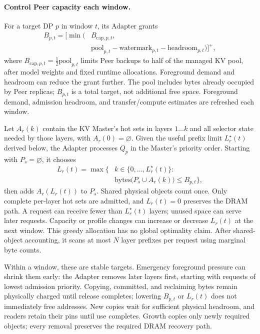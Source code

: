 \paragraph{Control Peer capacity each window.}
For a target DP $p$ in window $t$, its Adapter grants
\begin{equation}
 \begin{aligned}
 B_{p,t}=\bigl[\min\bigl(&B_{\mathrm{cap},p,t},\\
 &\mathrm{pool}_{p,t}-\mathrm{watermark}_{p,t}
              -\mathrm{headroom}_{p,t}\bigr)\bigr]^+,
 \end{aligned}
 \label{eq:peer-budget}
\end{equation}
where $B_{\mathrm{cap},p,t}=\tfrac12\mathrm{pool}_{p,t}$ limits Peer
backups to half of the managed KV pool, after model weights and fixed
runtime allocations. Foreground demand and headroom can reduce the
grant further. The pool includes bytes already occupied by Peer replicas;
$B_{p,t}$ is a total target, not additional free space. Foreground demand,
admission headroom, and transfer/compute estimates are refreshed each window.

Let $A_r(k)$ contain the KV Master's hot sets in layers $1\ldots k$
and all selector state needed by those layers, with $A_r(0)=\varnothing$.
Given the useful prefix limit $L_r^\star(t)$ derived below, the Adapter
processes $Q_p$ in the Master's priority order. Starting with $P_s=\varnothing$,
it chooses
\begin{equation}
 \begin{aligned}
 L_r(t)=\max\bigl\{&k\in\{0,\ldots,L_r^\star(t)\}:\\
                  &\mathrm{bytes}\bigl(P_s\cup A_r(k)\bigr)\le B_{p,t}\bigr\},
 \end{aligned}
 \label{eq:resident-prefix}
\end{equation}
then adds $A_r(L_r(t))$ to $P_s$. Shared physical objects count once.
Only complete per-layer hot sets are admitted, and $L_r(t)=0$ preserves
the DRAM path. A request can receive fewer than $L_r^\star(t)$ layers;
unused space can serve later requests. Capacity or profile changes can
increase or decrease $L_r(t)$ at the next window. This greedy allocation
has no global optimality claim. After shared-object accounting, it scans
at most $N$ layer prefixes per request using marginal byte counts.

Within a window, these are stable targets. Emergency foreground pressure
can shrink them early: the Adapter removes later layers first, starting
with requests of lowest admission priority. Copying, committed, and
reclaiming bytes remain physically charged until release completes;
lowering $B_{p,t}$ or $L_r(t)$ does not immediately free addresses.
New copies wait for sufficient physical headroom, and readers retain
their pins until use completes. Growth copies only newly required
objects; every removal preserves the required DRAM recovery path.
